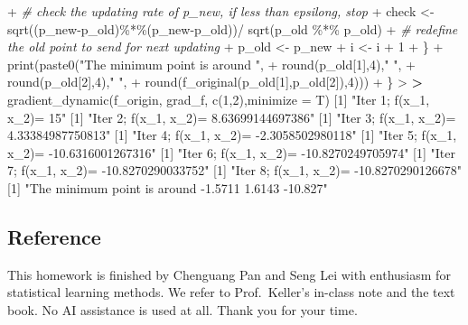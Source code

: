 \documentclass[
]{article}
\newenvironment{Shaded}{\begin{snugshade}}{\end{snugshade}}
\newcommand{\AttributeTok}[1]{\textcolor[rgb]{0.77,0.63,0.00}{#1}}
\newcommand{\CommentTok}[1]{\textcolor[rgb]{0.56,0.35,0.01}{\textit{#1}}}
\newcommand{\DecValTok}[1]{\textcolor[rgb]{0.00,0.00,0.81}{#1}}
\newcommand{\ErrorTok}[1]{\textcolor[rgb]{0.64,0.00,0.00}{\textbf{#1}}}
\newcommand{\FunctionTok}[1]{\textcolor[rgb]{0.00,0.00,0.00}{#1}}
\newcommand{\NormalTok}[1]{#1}
\newcommand{\OtherTok}[1]{\textcolor[rgb]{0.56,0.35,0.01}{#1}}
\newcommand{\SpecialCharTok}[1]{\textcolor[rgb]{0.00,0.00,0.00}{#1}}
\newcommand{\StringTok}[1]{\textcolor[rgb]{0.31,0.60,0.02}{#1}}
\begin{document}
\begin{Shaded}
\begin{Highlighting}[]
\SpecialCharTok{+}     \CommentTok{\# check the updating rate of p\_new, if less than epsilong, stop}
\SpecialCharTok{+}\NormalTok{     check }\OtherTok{\textless{}{-}} \FunctionTok{sqrt}\NormalTok{((p\_new}\SpecialCharTok{{-}}\NormalTok{p\_old)}\SpecialCharTok{\%*\%}\NormalTok{(p\_new}\SpecialCharTok{{-}}\NormalTok{p\_old))}\SpecialCharTok{/} \FunctionTok{sqrt}\NormalTok{(p\_old }\SpecialCharTok{\%*\%}\NormalTok{ p\_old)}
\SpecialCharTok{+}     \CommentTok{\# redefine the old point to send for next updating }
\SpecialCharTok{+}\NormalTok{     p\_old }\OtherTok{\textless{}{-}}\NormalTok{ p\_new}
\SpecialCharTok{+}\NormalTok{     i }\OtherTok{\textless{}{-}}\NormalTok{ i }\SpecialCharTok{+} \DecValTok{1}
\SpecialCharTok{+}\NormalTok{   \}}
\SpecialCharTok{+}   \FunctionTok{print}\NormalTok{(}\FunctionTok{paste0}\NormalTok{(}\StringTok{"The minimum point is around "}\NormalTok{, }
\SpecialCharTok{+}                \FunctionTok{round}\NormalTok{(p\_old[}\DecValTok{1}\NormalTok{],}\DecValTok{4}\NormalTok{),}\StringTok{" "}\NormalTok{,}
\SpecialCharTok{+}                \FunctionTok{round}\NormalTok{(p\_old[}\DecValTok{2}\NormalTok{],}\DecValTok{4}\NormalTok{),}\StringTok{" "}\NormalTok{,}
\SpecialCharTok{+}                \FunctionTok{round}\NormalTok{(}\FunctionTok{f\_original}\NormalTok{(p\_old[}\DecValTok{1}\NormalTok{],p\_old[}\DecValTok{2}\NormalTok{]),}\DecValTok{4}\NormalTok{)))}
\SpecialCharTok{+}\NormalTok{ \}}
\SpecialCharTok{\textgreater{}} 
\ErrorTok{\textgreater{}} \FunctionTok{gradient\_dynamic}\NormalTok{(f\_origin, grad\_f, }\FunctionTok{c}\NormalTok{(}\DecValTok{1}\NormalTok{,}\DecValTok{2}\NormalTok{),}\AttributeTok{minimize =}\NormalTok{ T)}
\NormalTok{[}\DecValTok{1}\NormalTok{] }\StringTok{"Iter 1; f(x\_1, x\_2)= 15"}
\NormalTok{[}\DecValTok{1}\NormalTok{] }\StringTok{"Iter 2; f(x\_1, x\_2)= 8.63699144697386"}
\NormalTok{[}\DecValTok{1}\NormalTok{] }\StringTok{"Iter 3; f(x\_1, x\_2)= 4.33384987750813"}
\NormalTok{[}\DecValTok{1}\NormalTok{] }\StringTok{"Iter 4; f(x\_1, x\_2)= {-}2.3058502980118"}
\NormalTok{[}\DecValTok{1}\NormalTok{] }\StringTok{"Iter 5; f(x\_1, x\_2)= {-}10.6316001267316"}
\NormalTok{[}\DecValTok{1}\NormalTok{] }\StringTok{"Iter 6; f(x\_1, x\_2)= {-}10.8270249705974"}
\NormalTok{[}\DecValTok{1}\NormalTok{] }\StringTok{"Iter 7; f(x\_1, x\_2)= {-}10.8270290033752"}
\NormalTok{[}\DecValTok{1}\NormalTok{] }\StringTok{"Iter 8; f(x\_1, x\_2)= {-}10.8270290126678"}
\NormalTok{[}\DecValTok{1}\NormalTok{] }\StringTok{"The minimum point is around {-}1.5711 1.6143 {-}10.827"}
\end{Highlighting}
\end{Shaded}

\hypertarget{reference}{%
\subsection{Reference}\label{reference}}

This homework is finished by Chenguang Pan and Seng Lei with enthusiasm
for statistical learning methods. We refer to Prof.~Keller's in-class
note and the text book. No AI assistance is used at all. Thank you for
your time.
\end{document}
